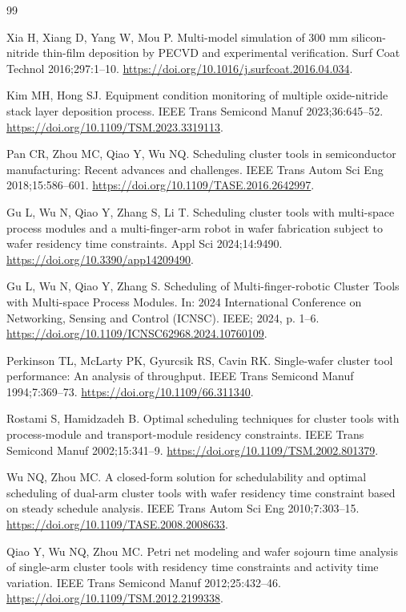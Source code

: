 \documentclass[final,5p,times,twocolumn]{elsarticle}
\begin{document}
\FloatBarrier
\small
\setlength{\bibsep}{0pt}
\begin{thebibliography}{99}

Xia H, Xiang D, Yang W, Mou P. Multi-model simulation of 300 mm silicon-nitride thin-film deposition by PECVD and experimental verification.
Surf Coat Technol 2016;297:1--10.
\url{https://doi.org/10.1016/j.surfcoat.2016.04.034}.

Kim MH, Hong SJ. Equipment condition monitoring of multiple oxide-nitride stack layer deposition process.
IEEE Trans Semicond Manuf 2023;36:645--52.
\url{https://doi.org/10.1109/TSM.2023.3319113}.

Pan CR, Zhou MC, Qiao Y, Wu NQ. Scheduling cluster tools in semiconductor manufacturing: Recent advances and challenges.
IEEE Trans Autom Sci Eng 2018;15:586--601.
\url{https://doi.org/10.1109/TASE.2016.2642997}.

Gu L, Wu N, Qiao Y, Zhang S, Li T. Scheduling cluster tools with multi-space process modules and a multi-finger-arm robot in wafer fabrication subject to wafer residency time constraints.
Appl Sci 2024;14:9490.
\url{https://doi.org/10.3390/app14209490}.

Gu L, Wu N, Qiao Y, Zhang S. Scheduling of {Multi-finger-robotic Cluster Tools} with {Multi-space Process Modules}.
In: 2024 International Conference on Networking, Sensing and Control ({ICNSC}). IEEE; 2024, p. 1--6.
\url{https://doi.org/10.1109/ICNSC62968.2024.10760109}.

Perkinson TL, McLarty PK, Gyurcsik RS, Cavin RK. Single-wafer cluster tool performance: An analysis of throughput.
IEEE Trans Semicond Manuf 1994;7:369--73.
\url{https://doi.org/10.1109/66.311340}.

Rostami S, Hamidzadeh B. Optimal scheduling techniques for cluster tools with process-module and transport-module residency constraints.
IEEE Trans Semicond Manuf 2002;15:341--9.
\url{https://doi.org/10.1109/TSM.2002.801379}.

Wu NQ, Zhou MC. A closed-form solution for schedulability and optimal scheduling of dual-arm cluster tools with wafer residency time constraint based on steady schedule analysis.
IEEE Trans Autom Sci Eng 2010;7:303--15.
\url{https://doi.org/10.1109/TASE.2008.2008633}.

Qiao Y, Wu NQ, Zhou MC. Petri net modeling and wafer sojourn time analysis of single-arm cluster tools with residency time constraints and activity time variation.
IEEE Trans Semicond Manuf 2012;25:432--46.
\url{https://doi.org/10.1109/TSM.2012.2199338}.


\end{thebibliography}
\end{document}
